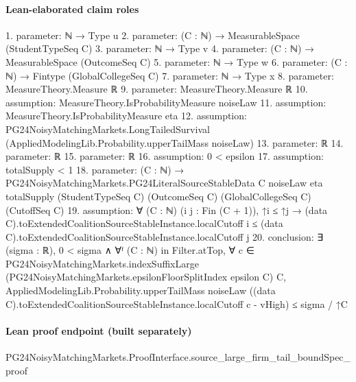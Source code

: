 \documentclass[10pt]{article}
\begin{document}
\paragraph{Lean-elaborated claim roles}\begin{ReviewVerbatim}
1. parameter: ℕ → Type u
2. parameter: (C : ℕ) → MeasurableSpace (StudentTypeSeq C)
3. parameter: ℕ → Type v
4. parameter: (C : ℕ) → MeasurableSpace (OutcomeSeq C)
5. parameter: ℕ → Type w
6. parameter: (C : ℕ) → Fintype (GlobalCollegeSeq C)
7. parameter: ℕ → Type x
8. parameter: MeasureTheory.Measure ℝ
9. parameter: MeasureTheory.Measure ℝ
10. assumption: MeasureTheory.IsProbabilityMeasure noiseLaw
11. assumption: MeasureTheory.IsProbabilityMeasure eta
12. assumption: PG24NoisyMatchingMarkets.LongTailedSurvival (AppliedModelingLib.Probability.upperTailMass noiseLaw)
13. parameter: ℝ
14. parameter: ℝ
15. parameter: ℝ
16. assumption: 0 < epsilon
17. assumption: totalSupply < 1
18. parameter: (C : ℕ) →
  PG24NoisyMatchingMarkets.PG24LiteralSourceStableData C noiseLaw eta totalSupply (StudentTypeSeq C) (OutcomeSeq C)
    (GlobalCollegeSeq C) (CutoffSeq C)
19. assumption: ∀ (C : ℕ) (i j : Fin (C + 1)),
  ↑i ≤ ↑j →
    (data C).toExtendedCoalitionSourceStableInstance.localCutoff i ≤
      (data C).toExtendedCoalitionSourceStableInstance.localCutoff j
20. conclusion: ∃ (sigma : ℝ),
  0 < sigma ∧
    ∀ᶠ (C : ℕ) in Filter.atTop,
      ∀ c ∈ PG24NoisyMatchingMarkets.indexSuffixLarge (PG24NoisyMatchingMarkets.epsilonFloorSplitIndex epsilon C) C,
        AppliedModelingLib.Probability.upperTailMass noiseLaw
            ((data C).toExtendedCoalitionSourceStableInstance.localCutoff c - vHigh) ≤
          sigma / ↑C
\end{ReviewVerbatim}

\paragraph{Lean proof endpoint (built separately)}\begin{ReviewVerbatim}
PG24NoisyMatchingMarkets.ProofInterface.source_large_firm_tail_boundSpec_proof
\end{ReviewVerbatim}
\end{document}
